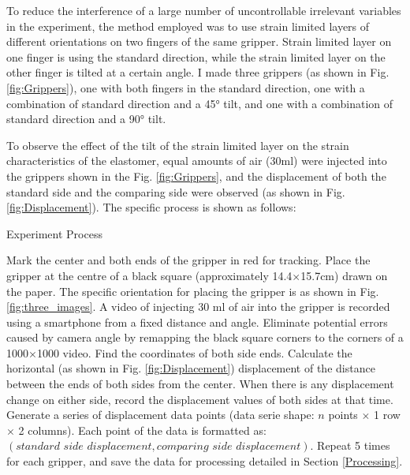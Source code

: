 \documentclass[conference]{IEEEtran}
\begin{document}
To reduce the interference of a large number of uncontrollable irrelevant variables in the experiment, the method employed was to use strain limited layers of different orientations on two fingers of the same gripper. Strain limited layer on one finger is using the standard direction, while the strain limited layer on the other finger is tilted at a certain angle. I made three grippers (as shown in Fig. \ref{fig:Grippers}), one with both fingers in the standard direction, one with a combination of standard direction and a 45° tilt, and one with a combination of standard direction and a 90° tilt. 


To observe the effect of the tilt of the strain limited layer on the strain characteristics of the elastomer, equal amounts of air (30ml) were injected into the grippers shown in the Fig. \ref{fig:Grippers}, and the displacement of both the standard side and the comparing side were observed (as shown in Fig. \ref{fig:Displacement}). The specific process is shown as follows:

\begin{algorithm}
\label{Algorithm}
	\caption{Experiment Process}\label{pseudo:ExperimentProcess}
	\begin{algorithmic}[1]
            \State Mark the center and both ends of the gripper in red for tracking.
            \State Place the gripper at the centre of a black square (approximately 14.4$\times$15.7cm) drawn on the paper. The specific orientation for placing the gripper is as shown in Fig. \ref{fig:three_images}.
            \State A video of injecting 30 ml of air into the gripper is recorded using a smartphone from a fixed distance and angle.
            \State Eliminate potential errors caused by camera angle by remapping the black square corners to the corners of a 1000$\times$1000 video. 
            \State Find the coordinates of both side ends.
            \State Calculate the horizontal (as shown in Fig. \ref{fig:Displacement}) displacement of the distance between the ends of both sides from the center.
            \State When there is any displacement change on either side, record the displacement values of both sides at that time. Generate a series of displacement data points (data serie shape: $n$ points $\times$ 1 row $\times$ 2 columns). Each point of the data is formatted as: $(\textit{standard side displacement}, \textit{comparing side displacement})$.
            \State Repeat 5 times for each gripper, and save the data for processing detailed in Section \ref{Processing}.
	\end{algorithmic} 
\end{algorithm}
\end{document}
